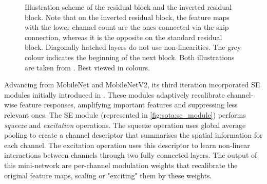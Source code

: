 \begin{figure}[htbp]
    \centering
    \caption{Illustration scheme of the residual block and the inverted residual
    block. Note that on the inverted residual block, the feature maps with the lower
    channel count are the ones connected via the skip connection, whereas it is the
    opposite on the standard residual block. Diagonally hatched layers do not use
    non-linearities. The grey colour indicates the beginning of the next block. Both
    illustrations are taken from \cite{DongMobileNetV2}. Best viewed in colours.}
    \label{fig:sota:inverted_vs_residual_blocks}
\end{figure}


Advancing from MobileNet and MobileNetV2, its third iteration
\cite{DBLP:conf/iccv/HowardPALSCWCTC19} incorporated \ac{SE} modules initially
introduced in \cite{DBLP:conf/cvpr/HuSS18}. These modules adaptively recalibrate
channel-wise feature responses, amplifying important features and suppressing
less relevant ones. The \ac{SE} module (represented in
\cref{fig:sota:se_module}) performs \emph{squeeze} and \emph{excitation}
operations. The squeeze operation uses global average pooling to create a
channel descriptor that summarises the spatial information for each channel. The
excitation operation uses this descriptor to learn non-linear interactions
between channels through two fully connected layers. The output of this
mini-network are per-channel modulation weights that recalibrate the original
feature maps, scaling or "exciting" them by these weights.\\

